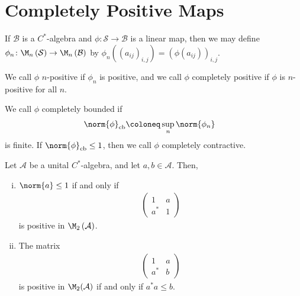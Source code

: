 \documentclass[10pt]{mypackage}
\begin{document}
\section{Completely Positive Maps}%
\begin{definition}
  If $\mathcal{B}$ is a $C^{\ast}$-algebra and $\phi\colon \mathcal{S}\rightarrow \mathcal{B}$ is a linear map, then we may define $\phi_n\colon \M_n\left( \mathcal{S} \right)\rightarrow \M_n\left( \mathcal{B} \right)$ by $\phi_n\left( \left( a_{ij} \right)_{i,j} \right) = \left( \phi\left( a_{ij} \right) \right)_{i,j}$.

  We call $\phi$ $n$-positive if $\phi_n$ is positive, and we call $\phi$ completely positive if $\phi$ is $n$-positive for all $n$.

  We call $\phi$ completely bounded if
  \begin{align*}
    \norm{\phi}_{\operatorname{cb}} &\coloneq \sup_{n}\norm{\phi_n}
  \end{align*}
  is finite. If $\norm{\phi}_{\text{cb}}\leq 1$, then we call $\phi$ completely contractive.
\end{definition}
\begin{lemma}
  Let $\mathcal{A}$ be a unital $C^{\ast}$-algebra, and let $a,b\in \mathcal{A}$. Then,
  \begin{enumerate}[(i)]
    \item $\norm{a}\leq 1$ if and only if
      \begin{align*}
        \begin{pmatrix}1 & a \\ a^{\ast} & 1\end{pmatrix}
      \end{align*}
      is positive in $\M_2\left(\mathcal{A}\right)$.
    \item The matrix
      \begin{align*}
        \begin{pmatrix}1 & a \\ a^{\ast} & b\end{pmatrix}
      \end{align*}
      is positive in $\M_2(\mathcal{A})$ if and only if $a^{\ast}a\leq b$.
  \end{enumerate}
\end{lemma}
\end{document}
